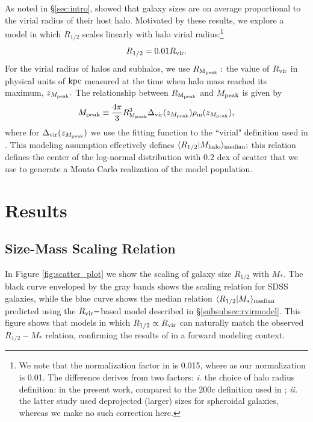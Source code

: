 \documentclass[usenatbib,usegraphicx,letterpaper]{mn2e}
\newcommand{\beq}{\begin{equation}}
\newcommand{\eeq}{\end{equation}}
\newcommand{\rhalf}{R_{1/2}}
\newcommand{\mstar}{M_{\ast}}
\newcommand{\mpeak}{M_{\rm peak}}
\newcommand{\zpeak}{z_{M_{\rm peak}}}
\newcommand{\mhalo}{M_{\rm halo}}
\newcommand{\rvir}{R_{\rm vir}}
\newcommand{\rmpeak}{R_{\rm M_{peak}}}
\newcommand{\median}[2]{\langle{#1}\vert{#2}\rangle_{\rm median}}
\newcommand{\kpc}{{\rm kpc}}
\begin{document}
As noted in \S\ref{sec:intro}, \citet{kravtsov13} showed that galaxy sizes are on average proportional to the virial radius of their host halo. Motivated by these results, we  explore a model in which $\rhalf$ scales linearly with halo virial radius:\footnote{We note that the normalization factor in \citet{kravtsov13} is 0.015, where as our normalization is 0.01. The difference derives from two factors: {\em i.} the choice of halo radius definition: \citet{bryan_norman98} in the present work, compared to the $200c$ definition used in \citet{kravtsov13}; {\em ii.} the latter study used deprojected (larger) sizes for spheroidal galaxies, whereas we make no such correction here.}
\beq
\label{eq:fiducial_model}
\rhalf = 0.01\rvir.
\eeq
For the virial radius of halos and subhalos, we use $\rmpeak:$ the value of $\rvir$ in physical units of $\kpc$ measured at the time when halo mass reached its maximum, $\zpeak.$  The relationship between $\rmpeak$ and $\mpeak$ is given by
\beq
\mpeak\equiv\frac{4\pi}{3}\rmpeak^{3}\Delta_{\rm vir}(\zpeak)\rho_{\rm m}(\zpeak),
\eeq
where for $\Delta_{\rm vir}(\zpeak)$ we use the fitting function to the ``virial" definition used in \citet{bryan_norman98}. This modeling assumption effectively defines $\median{\rhalf}{\mhalo};$ this relation defines the center of the log-normal distribution with $0.2$ dex of scatter that we use to generate a Monto Carlo realization of the model population.

\section{Results}
\label{sec:results}

\subsection{Size-Mass Scaling Relation}
\label{subsec:one_point_function}

In Figure \ref{fig:scatter_plot} we show the scaling of galaxy size $\rhalf$ with $\mstar.$ The black curve enveloped by the gray bands shows the scaling relation for SDSS galaxies, while the blue curve shows the median relation  $\median{\rhalf}{\mstar}$ predicted using the $\rvir-$based model described in \S\ref{subsubsec:rvirmodel}. This figure shows that models in which $\rhalf\propto\rvir$ can naturally match the observed $\rhalf-\mstar$ relation, confirming the results of \citet{kravtsov13} in a forward modeling context.
\end{document}
